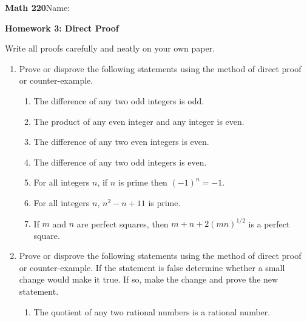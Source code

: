 \documentclass{article}
\begin{document}
{\bf Math 220}\hfill{Name:}

{\bf Homework 3: Direct Proof}
\vspace{.3in}






Write all proofs carefully and neatly on your own paper.

\begin{enumerate}
\item  Prove or disprove the following statements using the method of direct proof 
or counter-example.

\begin{enumerate}
\item The difference of any two odd integers is odd.

\smallskip

\item The product of any even integer and any integer is even.

\smallskip

\item The difference of any two even integers is even.

\smallskip

\item The difference of any two odd integers is even.

\smallskip

\item For all integers $n$, if $n$ is prime then $(-1)^n=-1$.

\smallskip

\item For all integers $n$, $n^2-n+11$ is prime.

\smallskip

\item If $m$ and $n$ are perfect squares, then $m+n+2(mn)^{1/2}$ is a perfect square.


\end{enumerate}

\item Prove or disprove the following statements using the method of direct proof 
or counter-example. If the statement is false determine whether a small change would
make it true. If so, make the change and prove the new statement.

\begin{enumerate}
\item The quotient of any two rational numbers is a rational number.


\end{enumerate}
\end{enumerate}
\end{document}
